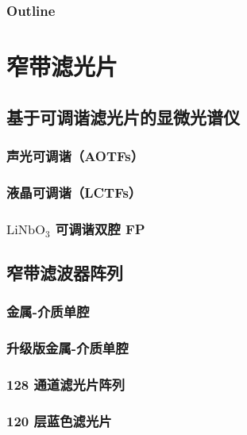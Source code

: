 \documentclass[9 pt,makeindex]{beamer}
\begin{document}
\frame{\titlepage}

\begin{frame}
    \frametitle{Outline}
    \tableofcontents
\end{frame}

\section{窄带滤光片}

\subsection{基于可调谐滤光片的显微光谱仪}
\subsubsection{声光可调谐（AOTFs）}

\subsubsection{液晶可调谐（LCTFs）}
\subsubsection{$\mathrm{LiNbO}_3$ 可调谐双腔 FP}


\subsection{窄带滤波器阵列}
\subsubsection{金属-介质单腔}

\subsubsection{升级版金属-介质单腔}

\subsubsection{128 通道滤光片阵列}

\subsubsection{120 层蓝色滤光片}

\end{document}

